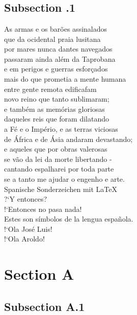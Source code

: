 \documentclass[12pt,draft,a4paper]{scrartcl}
\begin{document}
\tableofcontents
\newpage
\section{}
\subsection{Subsection .1}

As armas e os barões assinalados\\
que da ocidental praia lusitana\\
por mares nunca dantes navegados\\
passaram ainda além da Taprobana\\
e em perigos e guerras esforçados\\
mais do que prometia a mente humana\\
entre gente remota edificafam\\
novo reino que tanto sublimaram;\\

e também as memórias gloriosas\\
daqueles reis que foram dilatando\\
a Fé e o Império, e as terras viciosas\\
de África e de Ásia andaram devastando;\\
e aqueles que por obras valerosas\\
se vão da lei da morte libertando -\\
cantando espalharei por toda parte\\
se a tanto me ajudar o engenho e arte.\\


Spanische Sonderzeichen mit \LaTeX\\

?`Y entonces?\\
!`Entonces no pasa nada!\\
Estes son símbolos de la lengua española.\\
\flqq{}!`Ola José Luis!\frqq{}\\
\flq{}!`Ola Aroldo!\frq{}\\



\section{Section A}
\subsection{Subsection A.1}
\end{document}
